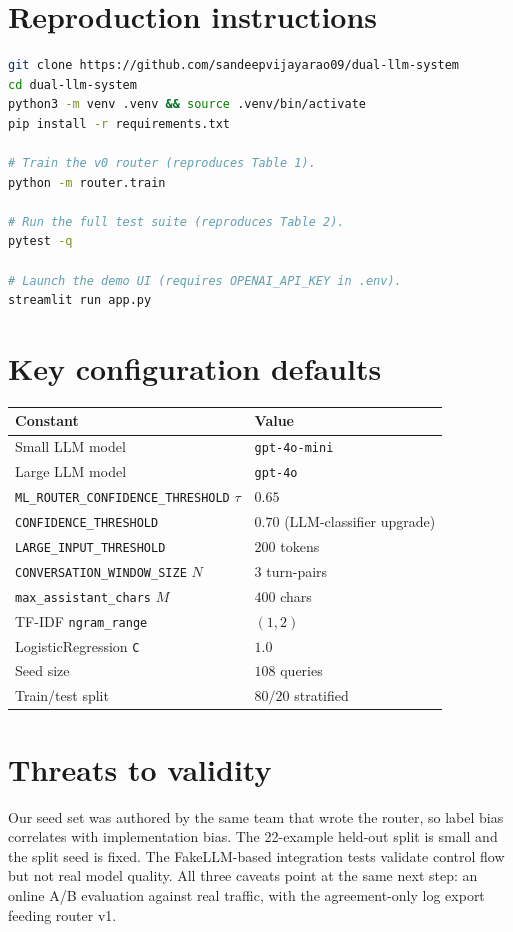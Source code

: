 \documentclass{article}
\begin{document}
\appendix

\section{Reproduction instructions}
\label{app:repro}

\begin{lstlisting}[language=bash]
git clone https://github.com/sandeepvijayarao09/dual-llm-system
cd dual-llm-system
python3 -m venv .venv && source .venv/bin/activate
pip install -r requirements.txt

# Train the v0 router (reproduces Table 1).
python -m router.train

# Run the full test suite (reproduces Table 2).
pytest -q

# Launch the demo UI (requires OPENAI_API_KEY in .env).
streamlit run app.py
\end{lstlisting}

\section{Key configuration defaults}

\begin{center}
\begin{tabular}{ll}
  \toprule
  Constant & Value \\
  \midrule
  Small LLM model                    & \texttt{gpt-4o-mini} \\
  Large LLM model                    & \texttt{gpt-4o} \\
  \texttt{ML\_ROUTER\_CONFIDENCE\_THRESHOLD} $\tau$ & $0.65$ \\
  \texttt{CONFIDENCE\_THRESHOLD}     & $0.70$ (LLM-classifier upgrade) \\
  \texttt{LARGE\_INPUT\_THRESHOLD}   & $200$ tokens \\
  \texttt{CONVERSATION\_WINDOW\_SIZE} $N$ & $3$ turn-pairs \\
  \texttt{max\_assistant\_chars} $M$ & $400$ chars \\
  TF-IDF \texttt{ngram\_range}       & $(1,2)$ \\
  LogisticRegression \texttt{C}      & $1.0$ \\
  Seed size                          & $108$ queries \\
  Train/test split                   & $80/20$ stratified \\
  \bottomrule
\end{tabular}
\end{center}

\section{Threats to validity}

Our seed set was authored by the same team that wrote the router, so label
bias correlates with implementation bias. The 22-example held-out split is
small and the split seed is fixed. The FakeLLM-based integration tests
validate control flow but not real model quality. All three caveats point at
the same next step: an online A/B evaluation against real traffic, with the
agreement-only log export feeding router v1.

\newpage

\end{document}
